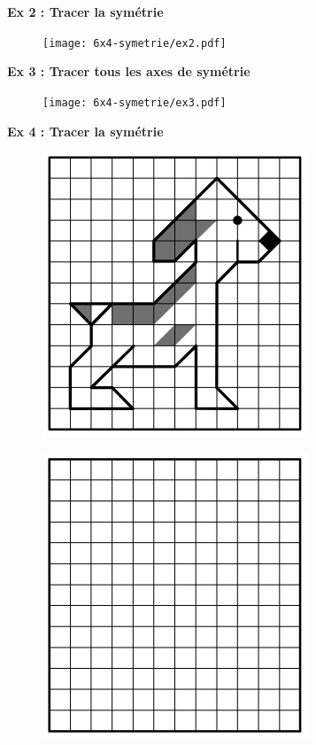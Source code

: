 \begin{multicols}{2} 
\textbf{Ex 2 : Tracer la symétrie}

\begin{figure}[H]
  \centering
  \texttt{[image: 6x4-symetrie/ex2.pdf]}
\end{figure}

\textbf{Ex 3 : Tracer tous les axes de symétrie}

\begin{figure}[H]
  \centering
  \texttt{[image: 6x4-symetrie/ex3.pdf]}
\end{figure}
\end{multicols}

\textbf{Ex 4 : Tracer la symétrie}

\begin{multicols}{2} 
\begin{figure}[H]
  \centering
  \includegraphics[width=0.6\linewidth]{6x4-symetrie/ex4a.png}
\end{figure}

\begin{figure}[H]
  \centering
  \includegraphics[width=0.6\linewidth]{6x4-symetrie/ex4b.png}
\end{figure}
\end{multicols}

